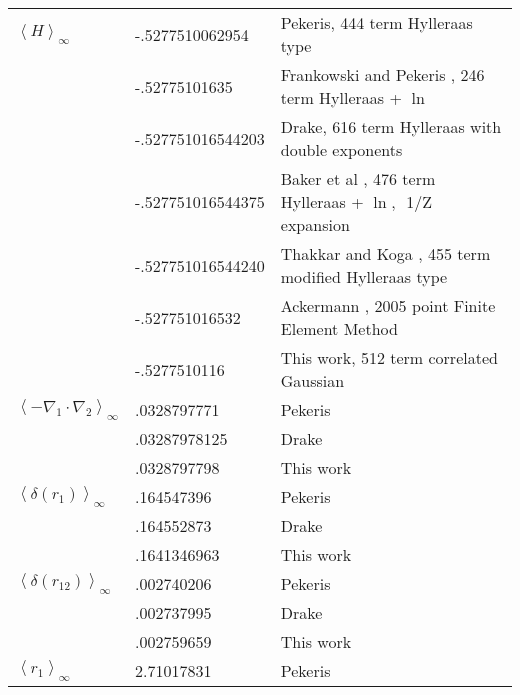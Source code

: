 \documentclass[12pt,thmsa]{article}
\begin{document}
\begin{table}[tbp] \centering%
\begin{tabular}{lll}
\hline\hline
$\left\langle H\right\rangle _\infty $ & -.5277510062954 & {\footnotesize %
Pekeris}\cite{Pekeris62}{\footnotesize , 444 term Hylleraas type} \\ 
& -.52775101635 & {\footnotesize Frankowski and Pekeris}\cite{Frankowski66}%
{\footnotesize , 246 term Hylleraas + }$\ln $ \\ 
& -.527751016544203 & {\footnotesize Drake}\cite{Drake88}{\footnotesize ,
616 term Hylleraas with double exponents} \\ 
& -.527751016544375 & {\footnotesize Baker et al }\cite{Baker90}%
{\footnotesize , 476 term Hylleraas + }$\ln ,${\footnotesize \ 1/Z expansion}
\\ 
& -.527751016544240 & {\footnotesize Thakkar and Koga}\cite{Thakkar94}%
{\footnotesize , 455 term modified Hylleraas type} \\ 
& -.527751016532 & {\footnotesize Ackermann}\cite{Ackermann95}{\footnotesize %
, 2005 point Finite Element Method} \\ 
& -.5277510116 & {\footnotesize This work, 512 term correlated Gaussian} \\ 
\hline
$\left\langle -\nabla _1\cdot \nabla _2\right\rangle _\infty $ & .0328797771
& {\footnotesize Pekeris}\cite{Pekeris62} \\ 
& .03287978125 & {\footnotesize Drake}\cite{Drake88} \\ 
& .0328797798 & {\footnotesize This work} \\ \hline
$\left\langle \delta \left( r_1\right) \right\rangle _\infty $ & .164547396
& {\footnotesize Pekeris}\cite{Pekeris62} \\ 
& .164552873 & {\footnotesize Drake}\cite{Drake88} \\ 
& .1641346963 & {\footnotesize This work} \\ \hline
$\left\langle \delta \left( r_{12}\right) \right\rangle _\infty $ & 
.002740206 & {\footnotesize Pekeris}\cite{Pekeris62} \\ 
& .002737995 & {\footnotesize Drake}\cite{Drake88} \\ 
& .002759659 & {\footnotesize This work} \\ \hline
$\left\langle r_1\right\rangle _\infty $ & 2.71017831 & {\footnotesize %
Pekeris}\cite{Pekeris62} \\ 

\end{tabular}
\end{table}
\end{document}
